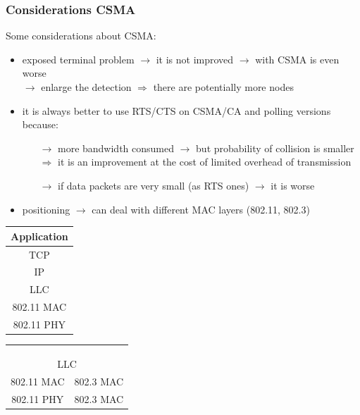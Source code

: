 \subsubsection{Considerations CSMA}
Some considerations about CSMA:
\begin{itemize}
    \item exposed terminal problem $\rightarrow$ it is not improved
    $\rightarrow$ with CSMA is even worse\\
    $\rightarrow$ enlarge the detection $\Rightarrow$ there are potentially more nodes
    \item it is always better to use RTS/CTS on CSMA/CA and polling versions because:
    \begin{itemize}
        \item[$\rightarrow$] more bandwidth consumed $\rightarrow$ but probability of collision is smaller\\
        $\Rightarrow$ it is an improvement at the cost of limited overhead of transmission
        \item[$\rightarrow$] if data packets are very small (as RTS ones) $\rightarrow$ it is worse
    \end{itemize}
    \item positioning $\rightarrow$ can deal with different MAC layers (802.11, 802.3)
\end{itemize}
\vspace*{0.4cm}
\begin{minipage}{.32 \linewidth}
\begin{tabular}{|c|}
    \hline
    \cellcolor{lightpink}Application\\
    \hline
    \cellcolor{lightred}TCP\\
    \hline
    \cellcolor{lightorange}IP\\
    \hline
    \cellcolor{lightyellow} LLC\\
    \hline
    \cellcolor{lightblue} 802.11 MAC\\
    \hline
    \cellcolor{lightblue} 802.11 PHY\\
    \hline
\end{tabular}
\end{minipage}
\begin{minipage}{.48 \linewidth}
\begin{tabular}{|c|c|}
    \multicolumn{2}{c}{}\\
    \multicolumn{2}{c}{}\\
    \multicolumn{2}{c}{}\\
    \hline
    \multicolumn{2}{|c|}{\cellcolor{lightyellow} LLC}\\
    \hline
    \cellcolor{lightblue} 802.11 MAC & \cellcolor{lightgreen} 802.3 MAC\\
    \hline
    \cellcolor{lightblue} 802.11 PHY & \cellcolor{lightgreen} 802.3 MAC\\
    \hline
\end{tabular}
\end{minipage}
